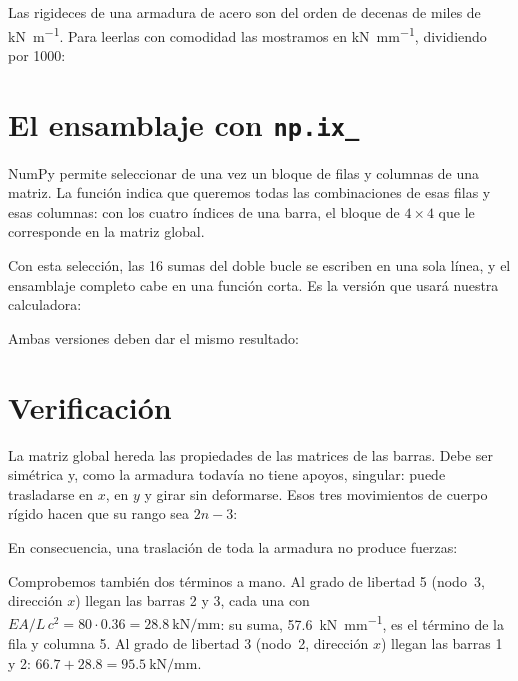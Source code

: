 Las rigideces de una armadura de acero son del orden de decenas de miles de
\si{\kilo\newton\per\metre}. Para leerlas con comodidad las mostramos en
\si{\kilo\newton\per\milli\metre}, dividiendo por 1000:

\section{El ensamblaje con \texttt{np.ix\_}}\label{sec:ix}

NumPy permite seleccionar de una vez un bloque de filas y columnas de una
matriz. La función  indica que queremos todas las
combinaciones de esas filas y esas columnas: con los cuatro índices de una
barra, el bloque de $4\times4$ que le corresponde en la matriz global.

Con esta selección, las 16 sumas del doble bucle se escriben en una sola
línea, y el ensamblaje completo cabe en una función corta. Es la versión que
usará nuestra calculadora:

Ambas versiones deben dar el mismo resultado:

\section{Verificación}\label{sec:verificacion_ensamblaje}

La matriz global hereda las propiedades de las matrices de las barras. Debe
ser simétrica y, como la armadura todavía no tiene apoyos, singular: puede
trasladarse en $x$, en $y$ y girar sin deformarse. Esos tres movimientos de
cuerpo rígido hacen que su rango sea $2n - 3$:

En consecuencia, una traslación de toda la armadura no produce fuerzas:

Comprobemos también dos términos a mano. Al grado de libertad 5 (nodo~3,
dirección $x$) llegan las barras 2 y 3, cada una con $EA/L\,c^2 =
80 \cdot 0.36 = \SI{28.8}{\kilo\newton\per\milli\metre}$: su suma,
\SI{57.6}{\kilo\newton\per\milli\metre}, es el término de la fila y columna 5.
Al grado de libertad 3 (nodo~2, dirección $x$) llegan las barras 1 y 2:
$66.7 + 28.8 = \SI{95.5}{\kilo\newton\per\milli\metre}$.

